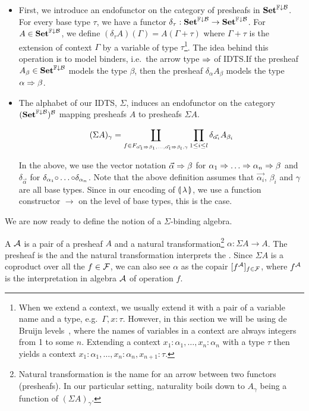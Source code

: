 \begin{itemize}
\item First, we introduce an endofunctor on the category of presheafs in
  $\mathbf{Set}^{\mathbb{F}\downarrow\mathcal{B}}$. For every base type $\tau$, we have a functor
  $\delta_\tau : \mathbf{Set}^{\mathbb{F}\downarrow\mathcal{B}} \to \mathbf{Set}^{\mathbb{F}\downarrow\mathcal{B}}$. For
  $A \in \mathbf{Set}^{\mathbb{F}\downarrow\mathcal{B}}$, we define
  $(\delta_\tau A)(\Gamma) = A(\Gamma + \tau)$ where $\Gamma + \tau$ is the
  extension of context $\Gamma$ by a variable of type $\tau$\footnote{When
    we extend a context, we usually extend it with a pair of a variable
    name and a type, e.g.\ $\Gamma, x : \tau$. However, in this section we
    will be using de Bruijn levels~\cite{de1972lambda}, where the names of
    variables in a context are always integers from 1 to some
    $n$. Extending a context $x_1 : \alpha_1, \ldots, x_n : \alpha_n$ with
    a type $\tau$ then yields a context
    $x_1 : \alpha_1, \ldots, x_n : \alpha_n, x_{n+1} : \tau$.}. The idea
  behind this operation is to model binders, i.e.\ the arrow type $\Rightarrow$ of
  IDTS.\@ If the presheaf $A_\beta \in \mathbf{Set}^{\mathbb{F}\downarrow\mathcal{B}}$ models the type
  $\beta$, then the presheaf $\delta_\alpha A_\beta$ models the type
  $\alpha \Rightarrow \beta$.

\item The alphabet of our IDTS, $\Sigma$, induces an endofunctor on the
  category $(\mathbf{Set}^{\mathbb{F}\downarrow\mathcal{B}})^{\mathcal{B}}$ mapping presheafs $A$ to presheafs
  $\Sigma A$.

  $$
  (\Sigma A)_\gamma = \coprod_{f \in F_{\vec{\alpha_1} \Rightarrow \beta_1, \ldots, \vec{\alpha_l} \Rightarrow \beta_l, \gamma}} \prod_{1 \le i \le l} \delta_{\vec{\alpha_i}} A_{\beta_i}
  $$

  In the above, we use the vector notation $\vec{\alpha} \Rightarrow \beta$ for
  $\alpha_1 \Rightarrow \ldots \Rightarrow \alpha_n \Rightarrow \beta$ and $\delta_{\vec{\alpha}}$
  for $\delta_{\alpha_1} {\mathbin{\circ}} \ldots {\mathbin{\circ}} \delta_{\alpha_n}$. Note that
  the above definition assumes that $\vec{\alpha_i}$, $\beta_i$ and
  $\gamma$ are all base types. Since in our encoding of $\llparenthesis \, \lambda \, \rrparenthesis$,
  we use a function constructor $\to$ on the level of base types, this is
  the case.
\end{itemize}

We are now ready to define the notion of a $\Sigma$-binding algebra.

\begin{definition}
  A  $\mathcal{A}$ is a pair of a presheaf $A$
  and a natural transformation\footnote{Natural transformation is the name
    for an arrow between two functors (presheafs). In our particular
    setting, naturality boils down to $A_\gamma$ being a function of
    $(\Sigma A)_\gamma$.} $\alpha : \Sigma A \to A$. The presheaf is the
   and the natural transformation interprets the
  . Since $\Sigma A$ is a coproduct over all the
  $f \in \mathcal{F}$, we can also see $\alpha$ as the copair
  $[f^{\mathcal{A}}]_{f \in \mathcal{F}}$, where $f^{\mathcal{A}}$ is the interpretation in algebra
  $\mathcal{A}$ of operation $f$.
\end{definition}

